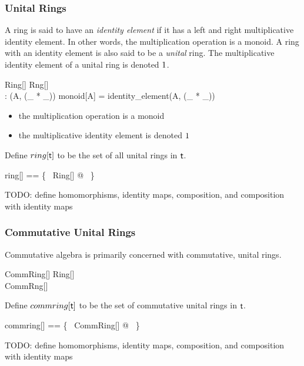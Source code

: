 \documentclass{amsart}
\begin{document}
\subsubsection{Unital Rings}

A ring is said to have an \textit{identity element} if it has a left and right multiplicative identity element.
In other words, the multiplication operation is a monoid.
A ring with an identity element is also said to be a \textit{unital} ring.
The multiplicative identity element of a unital ring is denoted $1$.

\begin{schema}{Ring}[\genT]
	Rng[\genT] \\
	\oneRing: \genT
\where
	(A, (\_ * \_)) \in monoid[A]
\also
	\oneRing = identity\_element(A, (\_ * \_))
\end{schema}

\begin{itemize}
	\item the multiplication operation is a monoid
	\item the multiplicative identity element is denoted $1$
\end{itemize}

Define $ring[\mathsf{t}]$ to be the set of all unital rings in $\mathsf{t}$.

\begin{zed}
	ring[\genT] == \{~ Ring[\genT] @ \strucA ~\}
\end{zed}

TODO: define homomorphisms, identity maps, composition, and composition with identity maps

\subsubsection{Commutative Unital Rings}

Commutative algebra is primarily concerned with commutative, unital rings.

\begin{schema}{CommRing}[\genT]
	Ring[\genT] \\
	CommRng[\genT]
\end{schema}

Define $commring[\mathsf{t}]$ to be the set of commutative unital rings in $\mathsf{t}$.

\begin{zed}
	commring[\genT] == \{~ CommRing[\genT] @ \strucA ~\}
\end{zed}

TODO: define homomorphisms, identity maps, composition, and composition with identity maps
\end{document}
